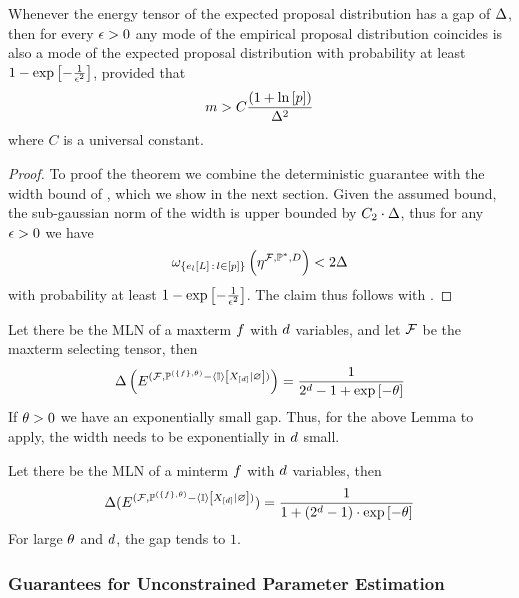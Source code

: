 \begin{theorem}
    \label{the:probGuaranteeProposalDist}
    Whenever the energy tensor of the expected proposal distribution has a gap of $\Delta$, then for every $\epsilon>0$ any mode of the empirical proposal distribution coincides is also a mode of the expected proposal distribution with probability at least $1-\mathrm{exp}\left[-\frac{1}{\epsilon^2}\right]$, provided that
    \begin{align*}
        m > C\frac{(1+\ln \left[ p \right])}{\Delta^2}
    \end{align*}
    where $C$ is a universal constant.
\end{theorem}
\begin{proof}
    To proof the theorem we combine the deterministic guarantee  with the width bound of , which we show in the next section.
    Given the assumed bound, the sub-gaussian norm of the width is upper bounded by $C_2\cdot \Delta$, thus for any $\epsilon>0$ we have
    \begin{align*}
        \omega_{\{e_{l}\left[L\right] \,:\, l\in[p] \}}\left(\eta^{\mathcal{F},\mathbb{P}^*,D}\right)  < 2 \Delta
    \end{align*}
    with probability at least $1-\mathrm{exp}\left[-\frac{1}{\epsilon^2}\right]$.
    The claim thus follows with .
\end{proof}


\begin{example}
    Let there be the MLN of a maxterm $f$ with $d$ variables, and let $\mathcal{F}$ be the maxterm selecting tensor, then
    \[ \Delta\left(
    E^{(\mathcal{F}, \mathbb{P}^{(\{f\},\theta)} - \left\langle \mathbb{I}\right\rangle \left[ X_{[d]} | \varnothing \right] )}
    \right) = \frac{1}{2^{d}-1 + \mathrm{exp}\left[-\theta\right]}  \]
    If $\theta>0$ we have an exponentially small gap.
    Thus, for the above Lemma to apply, the width needs to be exponentially in $d$ small.


    Let there be the MLN of a minterm $f$ with $d$ variables, then
    \[ \Delta(
    E^{(\mathcal{F}, \mathbb{P}^{(\{f\},\theta)} - \left\langle \mathbb{I}\right\rangle \left[ X_{[d]} | \varnothing \right] )}
    ) = \frac{1}{1+(2^{d}-1)\cdot\mathrm{exp}\left[-\theta\right]}  \]
    For large $\theta$ and $d$, the gap tends to $1$.
\end{example}

\subsubsection{Guarantees for Unconstrained Parameter Estimation}

